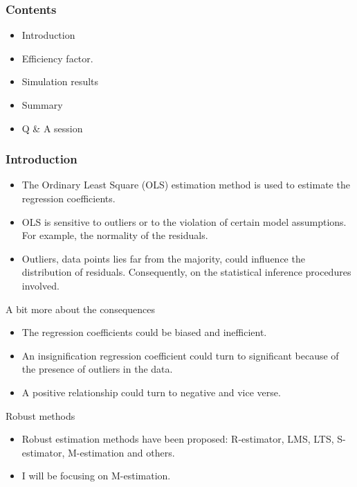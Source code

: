 \documentclass[english,svgnames,notes=hide,14pt]{beamer}
\title{\large\presentationtitle}
\author{Atiq Ur Rehman\\
		\small Supervised by Insha Ullah and Dost Muhammad\\
		\small 
	}
\date{}
\begin{document}
\thispagestyle{empty}
\begin{frame}
  \titlepage
\end{frame}




\begin{frame}
\frametitle{Contents}
\begin{itemize}
\item Introduction
\item Efficiency factor.
\item Simulation results
\item Summary
\item Q \& A session
\end{itemize}
\end{frame}


\begin{frame}
	\frametitle{Introduction}
	\begin{itemize}
		\item The Ordinary Least Square (OLS) estimation method is used to estimate the regression coefficients.
		\item OLS is sensitive to outliers or to the violation of certain model assumptions. For example, the normality of the residuals.
		\item  Outliers, data points lies far from the majority, could influence the distribution of residuals. Consequently, on the statistical inference procedures involved.
	\end{itemize}
\end{frame}

\begin{frame}{A bit more about the consequences}
\begin{itemize}
    	\item The regression coefficients could be biased and inefficient.
    	\item An insignification regression coefficient could turn to significant because of the presence of outliers in the data. 
    	\item A positive relationship could turn to negative and vice verse.
\end{itemize}
\end{frame}

\begin{frame}{Robust methods}

\begin{itemize}
    \item Robust estimation methods have been proposed: R-estimator, LMS, LTS, S-estimator, M-estimation and others. 
    \item I will be focusing on M-estimation. 
\end{itemize}
\end{frame}
\end{document}
